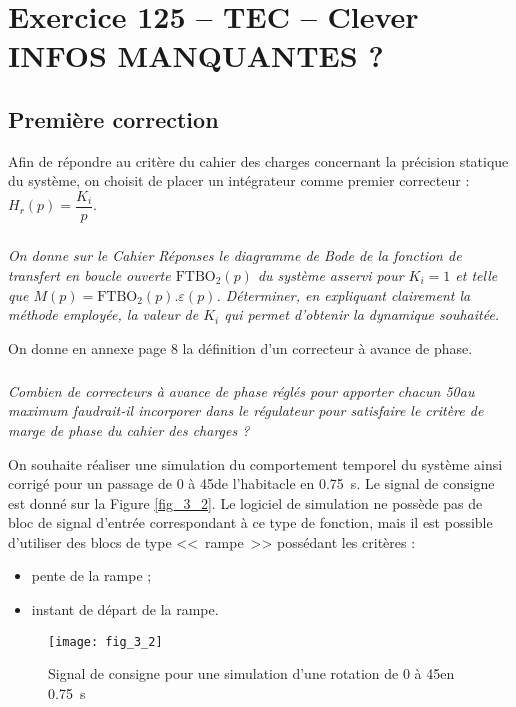 \section*{Exercice 125 -- TEC -- Clever INFOS MANQUANTES  ?}
\setcounter{exo}{0}


\subsection*{Première correction}
Afin de répondre au critère du cahier des charges concernant la précision statique du système, on choisit de placer un intégrateur comme premier correcteur : $H_r(p)=\dfrac{K_i}{p}$.

\subparagraph{}
\textit{On donne sur le Cahier Réponses le diagramme de Bode de la fonction de transfert en boucle ouverte $ \text{FTBO}_2(p)$ du système asservi pour $K_i = 1$ et telle que $M(p) = \text{FTBO}_2(p).\varepsilon(p)$. Déterminer, en expliquant clairement la méthode employée, la valeur de $K_i$ qui permet d'obtenir la dynamique souhaitée.}
\ifprof
\begin{corrige}
\end{corrige}
\else
\fi

On donne en annexe page 8 la définition d'un correcteur à avance de phase.
\subparagraph{}
\textit{Combien de correcteurs à avance de phase réglés pour apporter chacun 50\degres au maximum faudrait-il incorporer dans le régulateur pour satisfaire le critère de marge de phase du cahier des charges ?}
\ifprof
\begin{corrige}
\end{corrige}
\else
\fi



On souhaite réaliser une simulation du comportement temporel du système ainsi corrigé pour un passage de 0 à 45\degres de l'habitacle en \SI{0,75}{s}. Le signal de consigne est donné sur la Figure \autoref{fig_3_2}. Le logiciel de simulation ne possède pas de bloc de signal d'entrée correspondant à ce type de fonction, mais il est possible d'utiliser des blocs de type  <<~rampe~>> possédant les critères :
\begin{itemize}
\item pente de la rampe ;
\item instant de départ de la rampe.
\end{itemize}


\begin{figure}[H]
\centering
\texttt{[image: fig\_3\_2]}
\caption{ Signal de consigne pour une simulation d'une rotation de 0 à 45\degres en \SI{0,75}{s}}
\label{fig_3_2}
\end{figure}


